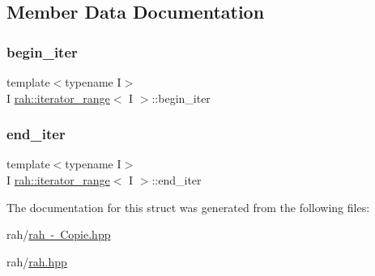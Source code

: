 \subsection{Member Data Documentation}
\mbox{\label{structrah_1_1iterator__range_a7c1da45d5ed07caead073472776cf298}} 
\subsubsection{\texorpdfstring{begin\_iter}{begin\_iter}}
{\footnotesize\ttfamily template$<$typename I$>$ \\
I \mbox{\hyperlink{structrah_1_1iterator__range}{rah\+::iterator\+\_\+range}}$<$ I $>$\+::begin\+\_\+iter}

\mbox{\label{structrah_1_1iterator__range_aa9bfeef57b703dbdd5444afb426db863}} 
\subsubsection{\texorpdfstring{end\_iter}{end\_iter}}
{\footnotesize\ttfamily template$<$typename I$>$ \\
I \mbox{\hyperlink{structrah_1_1iterator__range}{rah\+::iterator\+\_\+range}}$<$ I $>$\+::end\+\_\+iter}



The documentation for this struct was generated from the following files\+:\begin{DoxyCompactItemize}
\item 
rah/\mbox{\hyperlink{rah_01-_01_copie_8hpp}{rah -\/ Copie.\+hpp}}\item 
rah/\mbox{\hyperlink{rah_8hpp}{rah.\+hpp}}\end{DoxyCompactItemize}
